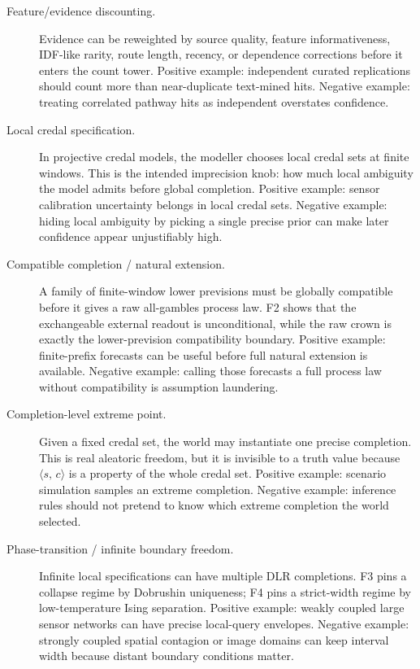 \documentclass[]{article}
\newcommand{\STV}[2]{\langle #1,\, #2 \rangle}
\begin{document}
\begin{description}
\item[Feature/evidence discounting.]
      Evidence can be reweighted by source quality, feature informativeness,
      IDF-like rarity, route length, recency, or dependence corrections before
      it enters the count tower. Positive example: independent curated
      replications should count more than near-duplicate text-mined hits.
      Negative example: treating correlated pathway hits as independent
      overstates confidence.

\item[Local credal specification.]
      In projective credal models, the modeller chooses local credal sets at
      finite windows. This is the intended imprecision knob: how much local
      ambiguity the model admits before global completion. Positive example:
      sensor calibration uncertainty belongs in local credal sets. Negative
      example: hiding local ambiguity by picking a single precise prior can
      make later confidence appear unjustifiably high.

\item[Compatible completion / natural extension.]
      A family of finite-window lower previsions must be globally compatible
      before it gives a raw all-gambles process law. F2 shows that the
      exchangeable external readout is unconditional, while the raw crown is
      exactly the lower-prevision compatibility boundary. Positive example:
      finite-prefix forecasts can be useful before full natural extension is
      available. Negative example: calling those forecasts a full process law
      without compatibility is assumption laundering.

\item[Completion-level extreme point.]
      Given a fixed credal set, the world may instantiate one precise
      completion. This is real aleatoric freedom, but it is invisible to a
      truth value because $\STV{s}{c}$ is a property of the whole credal set.
      Positive example: scenario simulation samples an extreme completion.
      Negative example: inference rules should not pretend to know which
      extreme completion the world selected.

\item[Phase-transition / infinite boundary freedom.]
      Infinite local specifications can have multiple DLR completions. F3
      pins a collapse regime by Dobrushin uniqueness; F4 pins a strict-width
      regime by low-temperature Ising separation. Positive example: weakly
      coupled large sensor networks can have precise local-query envelopes.
      Negative example: strongly coupled spatial contagion or image domains
      can keep interval width because distant boundary conditions matter.


\end{description}
\end{document}
